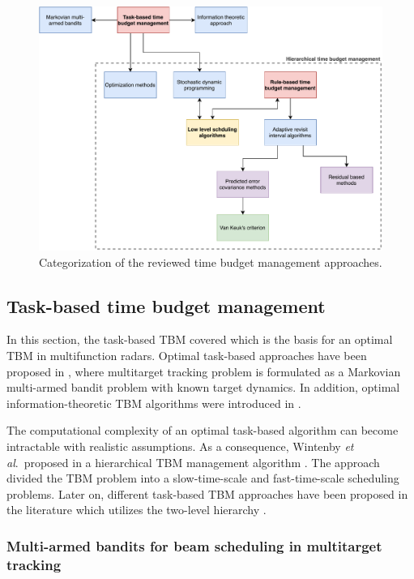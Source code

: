 \documentclass[english, 12pt, a4paper, elec, utf8, a-1b, online]{aaltothesis}
\newcommand{\etal}{\textit{et al}.~}
\begin{document}
\begin{figure}[h]
    \centering
    \includegraphics[width=\textwidth]{figures/TBM_algorithms.pdf}
    \caption{Categorization of the reviewed time budget management approaches.}
    \label{fig:tbm_categorization}
\end{figure}

\subsection{Task-based time budget management}

In this section, the task-based TBM covered which is the basis for an optimal TBM in multifunction radars.
Optimal task-based approaches have been proposed in \cite{Krishnamurthy1999, Krishnamurthy2001}, where multitarget tracking problem is formulated as a Markovian multi-armed bandit problem with known target dynamics.  
In addition, optimal information-theoretic TBM algorithms were introduced in \cite{Kastella1997, Kreucher2004, Kreucher2005, Xu2010}.

The computational complexity of an optimal task-based algorithm can become intractable with realistic assumptions. 
As a consequence, Wintenby \etal proposed in \cite{Wintenby2006} a hierarchical TBM management algorithm \cite{Wintenby2006}.
The approach divided the TBM problem into a slow-time-scale and fast-time-scale scheduling problems.
Later on, different task-based TBM approaches have been proposed in the literature which utilizes the two-level hierarchy \cite{Byrne2015, Byrne2016, Esfahani2012}.


\subsubsection{Multi-armed bandits for beam scheduling in multitarget tracking}
\end{document}
